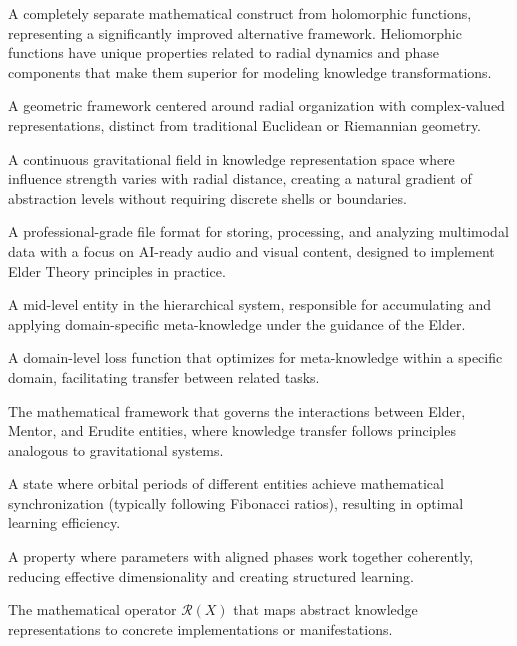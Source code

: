 \begin{description}[leftmargin=2cm, style=nextline]
    \item[Heliomorphic Function] A completely separate mathematical construct from holomorphic functions, representing a significantly improved alternative framework. Heliomorphic functions have unique properties related to radial dynamics and phase components that make them superior for modeling knowledge transformations.
    
    \item[Heliomorphic Geometry] A geometric framework centered around radial organization with complex-valued representations, distinct from traditional Euclidean or Riemannian geometry.
    
    \item[Gravitational Influence Field] A continuous gravitational field in knowledge representation space where influence strength varies with radial distance, creating a natural gradient of abstraction levels without requiring discrete shells or boundaries.
    
    \item[MAGE File] A professional-grade file format for storing, processing, and analyzing multimodal data with a focus on AI-ready audio and visual content, designed to implement Elder Theory principles in practice.
    
    \item[Mentor] A mid-level entity in the hierarchical system, responsible for accumulating and applying domain-specific meta-knowledge under the guidance of the Elder.
    
    \item[Mentor Loss] A domain-level loss function that optimizes for meta-knowledge within a specific domain, facilitating transfer between related tasks.
    
    \item[Orbital Mechanics] The mathematical framework that governs the interactions between Elder, Mentor, and Erudite entities, where knowledge transfer follows principles analogous to gravitational systems.
    
    \item[Orbital Resonance] A state where orbital periods of different entities achieve mathematical synchronization (typically following Fibonacci ratios), resulting in optimal learning efficiency.
    
    \item[Phase Coherence] A property where parameters with aligned phases work together coherently, reducing effective dimensionality and creating structured learning.
    
    \item[Realization] The mathematical operator $\mathcal{R}(X)$ that maps abstract knowledge representations to concrete implementations or manifestations.
\end{description}